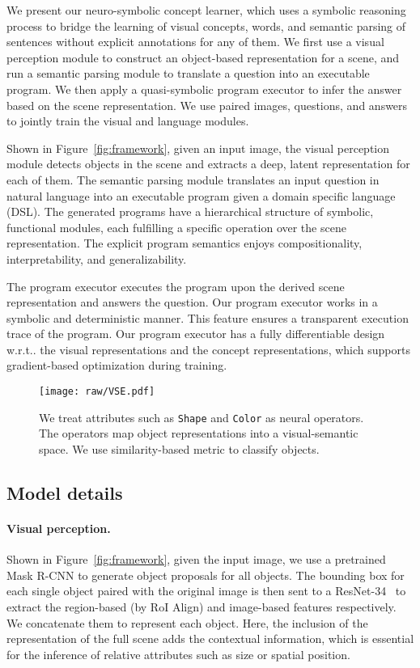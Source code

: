 \documentclass{article} \usepackage{iclr2019_conference,times}
\makeatletter
\newcommand{\fig}[1]{Figure~\ref{#1}}
\DeclareRobustCommand\onedot{\futurelet\@let@token\@onedot}
\def\@onedot{\ifx\@let@token.\else.\null\fi\xspace}
\def\wrt{w.r.t\onedot} \def\dof{d.o.f\onedot}
\newcommand{\modelfull}{neuro-symbolic concept learner\xspace}
\makeatother
\begin{document}
We present our \modelfull, which uses a symbolic reasoning process to bridge the learning of visual concepts, words, and semantic parsing of sentences without explicit annotations for any of them.
We first use a visual perception module to construct an object-based representation for a scene, and run a semantic parsing module to translate a question into an executable program. We then apply a quasi-symbolic program executor to infer the answer based on the scene representation. We use paired images, questions, and answers to jointly train the visual and language modules.

Shown in \fig{fig:framework}, given an input image, the visual perception module detects objects in the scene and extracts a deep, latent representation for each of them. The semantic parsing module translates an input question in natural language into an executable program given a domain specific language (DSL). The generated programs have a hierarchical structure of symbolic, functional modules, each fulfilling a specific operation over the scene representation. The explicit program semantics enjoys compositionality, interpretability, and generalizability.



The program executor executes the program upon the derived scene representation and answers the question. Our program executor works in a symbolic and deterministic manner.
This feature ensures a transparent execution trace of the program.
Our program executor has a fully differentiable design \wrt the visual representations and the concept representations, which supports gradient-based optimization during training.




\begin{figure}[t]
\centering \texttt{[image: raw/VSE.pdf]}
\caption{We treat attributes such as \texttt{Shape} and \texttt{Color} as neural operators. The operators map object representations into a visual-semantic space. We use similarity-based metric to classify objects.}
\vspace{-5pt}
\label{fig:vse}
\end{figure}
 
\subsection{Model details}

\paragraph{Visual perception.}
Shown in \fig{fig:framework}, given the input image, we use a pretrained Mask R-CNN \citep{He2017Mask} to generate object proposals for all objects. The bounding box for each single object paired with the original image is then sent to a ResNet-34~\citep{He2015Deep} to extract the region-based (by RoI Align) and image-based features respectively. We concatenate them to represent each object. Here, the inclusion of the representation of the full scene adds the contextual information, which is essential for the inference of relative attributes such as size or spatial position.
\end{document}

